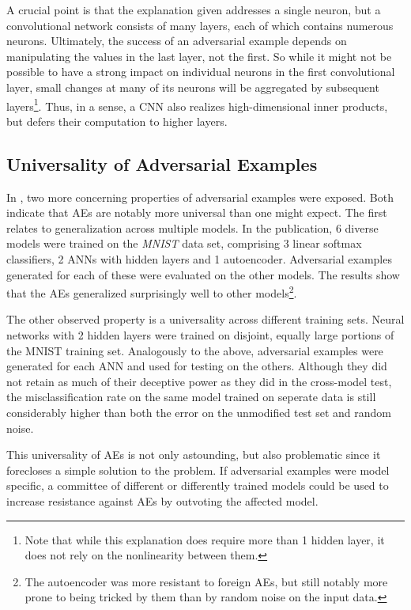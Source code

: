 \documentclass[11pt, a4paper]{article}
\begin{document}
A crucial point is that the explanation given addresses a single neuron, but a convolutional network consists of many layers, each of which contains numerous neurons. Ultimately, the success of an adversarial example depends on manipulating the values in the last layer, not the first. So while it might not be possible to have a strong impact on individual neurons in the first convolutional layer, small changes at many of its neurons will be aggregated by subsequent layers\footnote{Note that while this explanation does require more than 1 hidden layer, it does not rely on the nonlinearity between them.}. Thus, in a sense, a CNN also realizes high-dimensional inner products, but defers their computation to higher layers.

\subsection{Universality of Adversarial Examples}
In \cite{intriguing-properties-of-neural-networks}, two more concerning properties of adversarial examples were exposed. Both indicate that AEs are notably more universal than one might expect. The first relates to generalization across multiple models. In the publication, 6 diverse models were trained on the \emph{MNIST} data set, comprising 3 linear softmax classifiers, 2 ANNs with hidden layers and 1 autoencoder. Adversarial examples generated for each of these were evaluated on the other models. The results show that the AEs generalized surprisingly well to other models\footnote{The autoencoder was more resistant to foreign AEs, but still notably more prone to being tricked by them than by random noise on the input data.}.

The other observed property is a universality across different training sets. Neural networks with 2 hidden layers were trained on disjoint, equally large portions of the MNIST training set. Analogously to the above, adversarial examples were generated for each ANN and used for testing on the others. Although they did not retain as much of their deceptive power as they did in the cross-model test, the misclassification rate on the same model trained on seperate data is still considerably higher than both the error on the unmodified test set and random noise.

This universality of AEs is not only astounding, but also problematic since it forecloses a simple solution to the problem. If adversarial examples were model specific, a committee of different or differently trained models could be used to increase resistance against AEs by outvoting the affected model.
\end{document}
